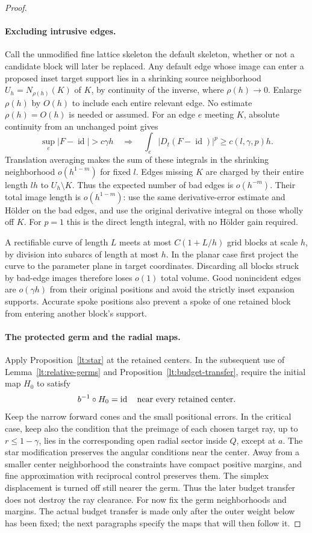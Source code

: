 \documentclass[11pt]{article}
\numberwithin{equation}{section}
\theoremstyle{definition}
\theoremstyle{remark}
\begin{document}
\begin{proof}
\paragraph{Excluding intrusive edges.}
Call the unmodified fine lattice skeleton the default skeleton,
whether or not a candidate block will later be replaced.  Any default
edge whose image can enter a proposed inset target support lies in a
shrinking source neighborhood $U_h=N_{\rho(h)}(K)$ of $K$, by
continuity of the inverse, where $\rho(h)\to0$.  Enlarge $\rho(h)$
by $O(h)$ to include each entire relevant edge.  No estimate
$\rho(h)=O(h)$ is needed or assumed.
For an edge $e$ meeting $K$, absolute continuity from an unchanged
point gives
\[
 \sup_e|F-\operatorname{id}|>c\gamma h
 \quad\Longrightarrow\quad
 \int_e|D_t(F-\operatorname{id})|^p\ge c(l,\gamma,p)h.
\]
Translation averaging makes the sum of these integrals in the
shrinking neighborhood $o(h^{1-m})$ for fixed $l$.  Edges missing $K$
are charged by their entire length $lh$ to
$U_h\setminus K$.  Thus the expected number of bad edges is
$o(h^{-m})$.  Their total image length is $o(h^{1-m})$: use the same
derivative-error estimate and H\"older on the bad edges, and use the
original derivative integral on those wholly off $K$.  For $p=1$
this is the direct length integral, with no H\"older gain required.

A rectifiable curve of length $L$ meets at most $C(1+L/h)$ grid blocks
at scale $h$, by division into subarcs of length at most $h$.  In the
planar case first project the curve to the parameter plane in target
coordinates.  Discarding all blocks struck by bad-edge images
therefore loses $o(1)$ total volume.  Good nonincident edges are
$o(\gamma h)$ from their original positions and avoid the strictly
inset expansion supports.  Accurate spoke positions also prevent a
spoke of one retained block from entering another block's support.

\paragraph{The protected germ and the radial maps.}
Apply Proposition~\ref{lt:star} at the retained centers.  In the
subsequent use of Lemma~\ref{lt:relative-germs} and
Proposition~\ref{lt:budget-transfer}, require the initial map $H_0$
to satisfy
\[
 b^{-1}\circ H_0=\operatorname{id}\quad\hbox{near every retained center}.
\]
Keep the narrow forward cones and the small positional errors.  In
the critical case, keep also the condition that the preimage of each
chosen target ray, up to $r\le1-\gamma$, lies in the corresponding
open radial sector inside $Q$, except at $a$.  The star modification
preserves the angular conditions near the center.  Away from a
smaller center neighborhood the constraints have compact positive
margins, and fine approximation with reciprocal control preserves
them.  The simplex displacement is turned off still nearer the
germ.  Thus the later budget transfer does not destroy the ray
clearance.  For now fix the germ neighborhoods and margins.  The
actual budget transfer is made only after the outer weight below
has been fixed; the next paragraphs specify the maps that will
then follow it.


\end{proof}
\end{document}
